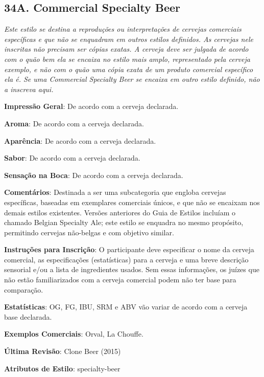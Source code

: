 \subsection*{34A. Commercial Specialty Beer}
\textit{Este estilo se destina a reproduções ou interpretações de cervejas comerciais específicas e que não se enquadram em outros estilos definidos. As cervejas nele inscritas não precisam ser cópias exatas. A cerveja deve ser julgada de acordo com o quão bem ela se encaixa no estilo mais amplo, representado pela cerveja exemplo, e não com o quão uma cópia exata de um produto comercial específico ela é. Se uma Commercial Specialty Beer se encaixa em outro estilo definido, não a inscreva aqui.}

\textbf{Impressão Geral}: De acordo com a cerveja declarada.

\textbf{Aroma}: De acordo com a cerveja declarada.

\textbf{Aparência}: De acordo com a cerveja declarada.

\textbf{Sabor}: De acordo com a cerveja declarada.

\textbf{Sensação na Boca}: De acordo com a cerveja declarada.

\textbf{Comentários}: Destinada a ser uma subcategoria que engloba cervejas específicas, baseadas em exemplares comerciais únicos, e que não se encaixam nos demais estilos existentes. Versões anteriores do Guia de Estilos incluíam o chamado Belgian Specialty Ale; este estilo se enquadra no mesmo propósito, permitindo cervejas não-belgas e com objetivo similar.

\textbf{Instruções para Inscrição}: O participante deve especificar o nome da cerveja comercial, as especificações (estatísticas) para a cerveja e uma breve descrição sensorial e/ou a lista de ingredientes usados. Sem essas informações, os juízes que não estão familiarizados com a cerveja comercial podem não ter base para comparação.

\textbf{Estatísticas}: OG, FG, IBU, SRM e ABV vão variar de acordo com a cerveja base declarada.

\textbf{Exemplos Comerciais}: Orval, La Chouffe.

\textbf{Última Revisão}: Clone Beer (2015)

\textbf{Atributos de Estilo}: specialty-beer

